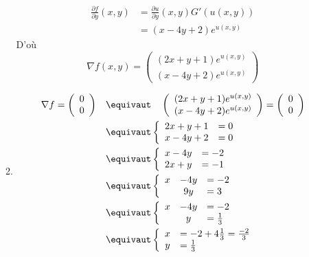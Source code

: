 \begin{correction}
\begin{enumerate}
\begin{enumerate}
\begin{align*}
\frac{\partial f}{\partial y} (x,y) &= \frac{\partial u}{\partial y} (x,y) G'(u(x,y))\\
												&= (x-4y+2) e^{u(x,y)}
\end{align*}
D'où 
$$\nabla f  (x,y) = \left( \begin{array}{c}
 (2x+y +1)e^{u(x,y)}\\
  (x-4y+2) e^{u(x,y)}
\end{array}
\right)$$
\item \begin{align*}
\nabla f = \left( \begin{array}{c}
0\\
0
\end{array}
\right)
\quad &\equivaut\quad  \left( \begin{array}{c}
 (2x+y +1)e^{u(x,y)}\\
  (x-4y+2) e^{u(x,y)}
\end{array}\right) =\left( \begin{array}{c}
0\\
0
\end{array}
\right)\\
&\equivaut \left\{\begin{array}{cl}
2x+y +1&=0\\
x-4y+2&=0
\end{array}\right.\\
&\equivaut \left\{\begin{array}{cl}
x-4y&=-2\\
2x+y&=-1
\end{array}\right.\\
&\equivaut \left\{\begin{array}{ccl}
x&-4y&=-2\\
&9y&=3
\end{array}\right.\\
&\equivaut \left\{\begin{array}{ccl}
x&-4y&=-2\\
&y&=\frac{1}{3}
\end{array}\right.\\
&\equivaut \left\{\begin{array}{cl}
x&=-2+4\frac{1}{3} = \frac{-2}{3}\\
y&=\frac{1}{3}
\end{array}\right.\\
\end{align*}



\end{enumerate}
\end{enumerate}
\end{correction}
